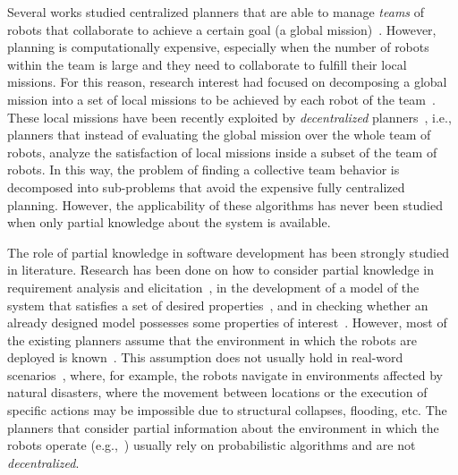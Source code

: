 Several works studied centralized planners that are able to manage \emph{teams} of robots that collaborate to achieve a certain goal (a global mission)~\cite{kloetzer2011multi,loizou2005automated,quottrup2004multi}.
However, planning is computationally expensive, especially when the number of robots within the team is large  and they need to collaborate to fulfill their local missions.
For this reason, research interest had focused on decomposing a global mission into a set of local missions to be achieved by each robot of the team~\cite{schillinger2016decomposition,guo2015multi,tumova2016multi}. 
These local missions have been recently exploited by \emph{decentralized} planners~\cite{tumova2016multi}, i.e., planners that instead of evaluating the global mission over the whole team of robots, analyze the satisfaction of local missions inside a subset of the team of robots. 
In this way, the problem of finding a collective team behavior is decomposed into sub-problems that avoid the expensive fully centralized planning. 
However, the applicability of these algorithms has never been studied when only partial knowledge about the system is available.



The role of partial knowledge in software development has been strongly studied in literature.
Research has been done on how to consider partial knowledge in requirement analysis and elicitation~\cite{menghi2017integrating,menghi2017cover,letier2008deriving}, in the development of a model of the system that satisfies a set of desired properties~\cite{uchitel2009synthesis,uchitel2013supporting,famelis2012partial,albarghouthi2012under,Bernasconi2017}, and in checking   whether an  already designed model possesses some properties of interest~\cite{menghi2016dealing,bruns1999model,chechik2004multi}.
However, most of the existing planners assume that the environment in which the robots are deployed is known~\cite{7139412}. 
This assumption does not usually hold in real-word scenarios~\cite{lahijanian2016iterative},  where, for example,  the robots navigate in environments affected by natural disasters, where the movement between locations or the execution of specific actions may be impossible due to structural collapses, flooding, etc.
The planners that consider  partial information about the environment in which the robots operate (e.g.,~\cite{roy2006planning,du2012robot,diaz2001exploring}) usually rely on probabilistic algorithms and are not  \emph{decentralized}.

